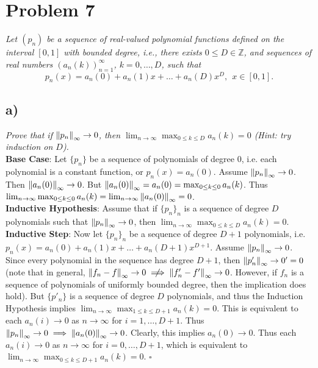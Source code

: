 \documentclass[12pt]{article}
\begin{document}
\section*{Problem 7}
{\it Let $(p_n)$ be a sequence of real-valued polynomial functions defined on the interval $[0,1]$ with bounded degree, i.e., there exists $0 \leq D \in \mathbb{Z}$, and sequences of real numbers $(a_n(k))_{n=1}^{\infty}$, $k = 0, \dots, D$, such that}
\begin{equation}
	\label{problem_7_polynomial}
	p_n(x) = a_n(0) + a_n(1)x + \dots + a_n(D)x^D,\ \ x \in [0,1].
\end{equation}

\subsection*{ a)}
{\it Prove that if $\norm{p_n}_\infty \rightarrow 0$, then $\lim_{n\rightarrow\infty}\max_{0\leq k\leq D}a_n(k) = 0$ (Hint: try induction on $D$).} \\

\textbf{Base Case}: Let $\{p_n\}$ be a sequence of polynomials of degree $0$, i.e. each polynomial is a constant function, or $p_n(x) = a_n(0)$.  Assume $\norm{p_n}_\infty \rightarrow 0$.  Then $\norm{a_n(0)}_\infty \rightarrow 0$.  But $\norm{a_n(0)}_\infty = a_n(0) = \max_{0\leq k\leq 0}a_n(k)$.  Thus $\lim_{n\rightarrow \infty} \max_{0\leq k\leq 0}a_n(k) = \lim_{n\rightarrow\infty} \norm{a_n(0)}_\infty = 0$. \\

\textbf{Inductive Hypothesis}: Assume that if $\{p_n\}_n$ is a sequence of degree $D$ polynomials such that $\norm{p_n}_\infty \rightarrow 0$, then $\lim_{n\rightarrow\infty}\max_{0\leq k\leq D}a_n(k) = 0$. \\

\textbf{Inductive Step}: Now let $\{p_n\}_n$ be a sequence of degree $D+1$ polynomials, i.e. $p_n(x) = a_n(0) + a_n(1)x + \dots + a_n(D+1)x^{D+1}$.  Assume $\norm{p_n}_\infty \rightarrow 0$.  Since every polynomial in the sequence has degree $D+1$, then $\norm{p'_n}_\infty \rightarrow 0' = 0$ (note that in general, $\norm{f_n - f}_\infty \rightarrow 0 \centernot\implies \norm{f'_n - f'}_\infty \rightarrow 0$.  However, if $f_n$ is a sequence of polynomials of uniformly bounded degree, then the implication does hold).  But $\{p'_n\}$ is a sequence of degree $D$ polynomials, and thus the Induction Hypothesis implies $\lim_{n\rightarrow\infty}\max_{1\leq k\leq D+1}a_n(k) = 0$.  This is equivalent to each $a_n(i) \rightarrow 0$ as $n\rightarrow \infty$ for $i = 1, \dots, D+1$.  Thus $\norm{p_n}_\infty \rightarrow 0 \implies \norm{a_n(0)}_\infty \rightarrow 0$.  Clearly, this implies $a_n(0) \rightarrow 0$.  Thus each $a_n(i) \rightarrow 0$ as $n\rightarrow\infty$ for $i = 0, \dots, D+1$, which is equivalent to $\lim_{n\rightarrow\infty}\max_{0\leq k\leq D+1}a_n(k) = 0$. \hfill $\square$
\end{document}

